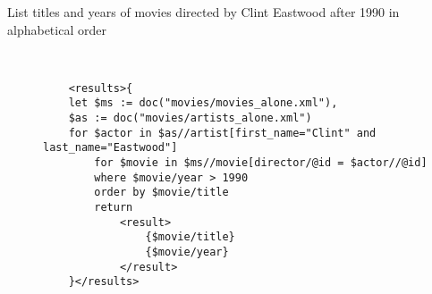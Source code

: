 \documentclass[xPath&xQuery.tex]{subfiles}
\begin{document}
\begin{description}
\item[List titles and years of movies directed by Clint Eastwood after 1990 in alphabetical order] \hfill \\
  \begin{verbatim}
	<results>{
	let $ms := doc("movies/movies_alone.xml"),
	$as := doc("movies/artists_alone.xml")
	for $actor in $as//artist[first_name="Clint" and last_name="Eastwood"]
	    for $movie in $ms//movie[director/@id = $actor//@id]
	    where $movie/year > 1990
	    order by $movie/title
	    return 
	        <result>
	            {$movie/title}
	            {$movie/year}
	        </result>
	}</results>
  \end{verbatim}
\end{description} 
\end{document}
